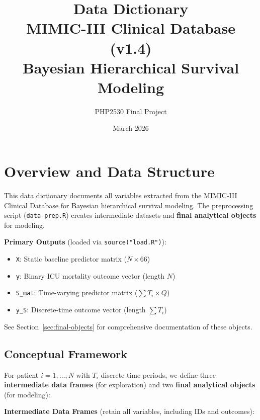 \documentclass[11pt]{article}
\title{\textbf{Data Dictionary}\\[0.5em]
\large MIMIC-III Clinical Database (v1.4)\\
Bayesian Hierarchical Survival Modeling}
\author{PHP2530 Final Project}
\date{March 2026}
\begin{document}
\maketitle
\tableofcontents
\newpage

\section{Overview and Data Structure}

This data dictionary documents all variables extracted from the MIMIC-III Clinical Database for Bayesian hierarchical survival modeling. The preprocessing script (\texttt{data-prep.R}) creates intermediate datasets and \textbf{final analytical objects} for modeling.

\textbf{Primary Outputs} (loaded via \texttt{source("load.R")}):
\begin{itemize}[nosep]
    \item \texttt{X}: Static baseline predictor matrix ($N \times 66$)
    \item \texttt{y}: Binary ICU mortality outcome vector (length $N$)
    \item \texttt{S\_mat}: Time-varying predictor matrix ($\sum T_i \times Q$)
    \item \texttt{y\_S}: Discrete-time outcome vector (length $\sum T_i$)
\end{itemize}

See Section~\ref{sec:final-objects} for comprehensive documentation of these objects.

\subsection{Conceptual Framework}

For patient $i = 1, \ldots, N$ with $T_i$ discrete time periods, we define three \textbf{intermediate data frames} (for exploration) and two \textbf{final analytical objects} (for modeling):

\textbf{Intermediate Data Frames} (retain all variables, including IDs and outcomes):
\end{document}
